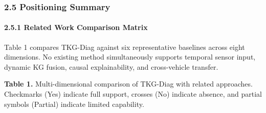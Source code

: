 \documentclass[
  11pt,
]{article}
\begin{document}
\subsubsection{2.5 Positioning Summary}\label{positioning-summary}

\paragraph{2.5.1 Related Work Comparison
Matrix}\label{related-work-comparison-matrix}

Table 1 compares TKG-Diag against six representative baselines across
eight dimensions. No existing method simultaneously supports temporal
sensor input, dynamic KG fusion, causal explainability, and
cross-vehicle transfer.

\textbf{Table 1.} Multi-dimensional comparison of TKG-Diag with related
approaches. Checkmarks (Yes) indicate full support, crosses (No)
indicate absence, and partial symbols (Partial) indicate limited
capability.
\end{document}
